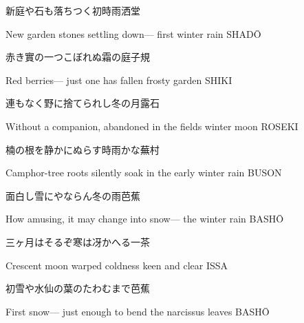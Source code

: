 \begin{haiku}
    {\FH 新庭や石も落ちつく初時雨}\hfill{\FH 洒堂}

    \vin{} New garden
    \vin{} \vin{} stones settling down---
    \vin{} \vin{} \vin{} first winter rain \hspace{\fill} SHAD\={O}
\end{haiku}

\begin{haiku}
    {\FH 赤き實の一つこぼれぬ霜の庭}\hfill{\FH 子規}

    \vin{} Red berries---
    \vin{} \vin{} just one has fallen
    \vin{} \vin{} \vin{} frosty garden \hspace{\fill} SHIKI
\end{haiku}

\begin{haiku}
    {\FH 連もなく野に捨てられし冬の月}\hfill{\FH 露石}

    \vin{} Without a companion,
    \vin{} \vin{} abandoned in the fields
    \vin{} \vin{} \vin{} winter moon \hspace{\fill} ROSEKI
\end{haiku}

\begin{haiku}
    {\FH 楠の根を静かにぬらす時雨かな}\hfill{\FH 蕪村}

    \vin{} Camphor-tree roots
    \vin{} \vin{} silently soak in
    \vin{} \vin{} \vin{} the early winter rain \hspace{\fill} BUSON
\end{haiku}

\begin{haiku}
    {\FH 面白し雪にやならん冬の雨}\hfill{\FH 芭蕉}

    \vin{} How amusing,
    \vin{} \vin{} it may change into snow---
    \vin{} \vin{} \vin{} the winter rain \hspace{\fill} BASH\={O}
\end{haiku}

\begin{haiku}
    {\FH 三ヶ月はそるぞ寒は冴かへる}\hfill{\FH 一茶}

    \vin{} Crescent moon warped
    \vin{} \vin{} coldness
    \vin{} \vin{} \vin{} keen and clear \hspace{\fill} ISSA
\end{haiku}

\begin{haiku}
    {\FH 初雪や水仙の葉のたわむまで}\hfill{\FH 芭蕉}

    \vin{} First snow---
    \vin{} \vin{} just enough to bend
    \vin{} \vin{} \vin{} the narcissus leaves \hspace{\fill} BASH\={O}
\end{haiku}

